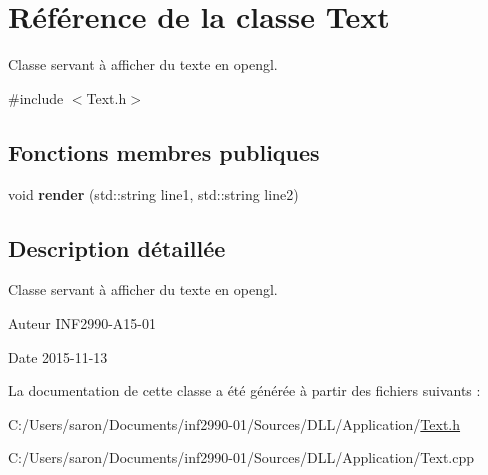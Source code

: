 \hypertarget{class_text}{\section{Référence de la classe Text}
\label{class_text}
}


Classe servant à afficher du texte en opengl.  




{\ttfamily \#include $<$Text.\-h$>$}

\subsection*{Fonctions membres publiques}
\begin{DoxyCompactItemize}
\item 
\hypertarget{class_text_ae53131471b43726c86aee84254f84738}{void {\bfseries render} (std\-::string line1, std\-::string line2)}\label{class_text_ae53131471b43726c86aee84254f84738}

\end{DoxyCompactItemize}


\subsection{Description détaillée}
Classe servant à afficher du texte en opengl. 

\begin{DoxyAuthor}{Auteur}
I\-N\-F2990-\/\-A15-\/01 
\end{DoxyAuthor}
\begin{DoxyDate}{Date}
2015-\/11-\/13 
\end{DoxyDate}


La documentation de cette classe a été générée à partir des fichiers suivants \-:\begin{DoxyCompactItemize}
\item 
C\-:/\-Users/saron/\-Documents/inf2990-\/01/\-Sources/\-D\-L\-L/\-Application/\hyperlink{_text_8h}{Text.\-h}\item 
C\-:/\-Users/saron/\-Documents/inf2990-\/01/\-Sources/\-D\-L\-L/\-Application/Text.\-cpp\end{DoxyCompactItemize}
